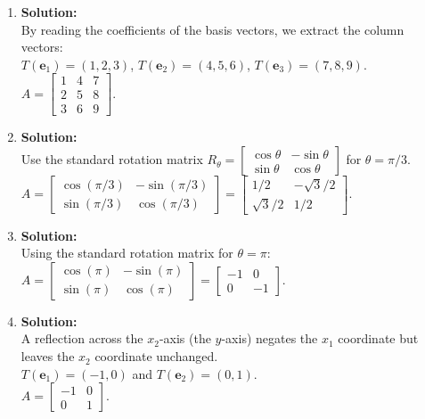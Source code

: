 \documentclass[12pt]{article}
\begin{document}
\begin{enumerate}
    \item \textbf{Solution:}\\
    By reading the coefficients of the basis vectors, we extract the column vectors:\\
    $T(\mathbf{e}_1) = (1, 2, 3)$, $T(\mathbf{e}_2) = (4, 5, 6)$, $T(\mathbf{e}_3) = (7, 8, 9)$. \\
    $A = \begin{bmatrix} 1 & 4 & 7 \\ 2 & 5 & 8 \\ 3 & 6 & 9 \end{bmatrix}$.

    \item \textbf{Solution:}\\
    Use the standard rotation matrix $R_\theta = \begin{bmatrix} \cos\theta & -\sin\theta \\ \sin\theta & \cos\theta \end{bmatrix}$ for $\theta = \pi/3$. \\
    $A = \begin{bmatrix} \cos(\pi/3) & -\sin(\pi/3) \\ \sin(\pi/3) & \cos(\pi/3) \end{bmatrix} = \begin{bmatrix} 1/2 & -\sqrt{3}/2 \\ \sqrt{3}/2 & 1/2 \end{bmatrix}$.

    \item \textbf{Solution:}\\
    Using the standard rotation matrix for $\theta = \pi$: \\
    $A = \begin{bmatrix} \cos(\pi) & -\sin(\pi) \\ \sin(\pi) & \cos(\pi) \end{bmatrix} = \begin{bmatrix} -1 & 0 \\ 0 & -1 \end{bmatrix}$.

    \item \textbf{Solution:}\\
    A reflection across the $x_2$-axis (the $y$-axis) negates the $x_1$ coordinate but leaves the $x_2$ coordinate unchanged. \\
    $T(\mathbf{e}_1) = (-1, 0)$ and $T(\mathbf{e}_2) = (0, 1)$. \\
    $A = \begin{bmatrix} -1 & 0 \\ 0 & 1 \end{bmatrix}$.


\end{enumerate}
\end{document}
